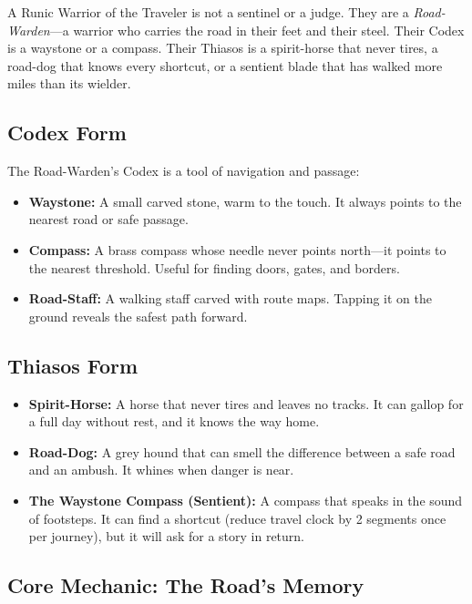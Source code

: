 A Runic Warrior of the Traveler is not a sentinel or a judge. They are a \textit{Road-Warden}—a warrior who carries the road in their feet and their steel. Their Codex is a waystone or a compass. Their Thiasos is a spirit-horse that never tires, a road-dog that knows every shortcut, or a sentient blade that has walked more miles than its wielder.

\subsection{Codex Form}

The Road-Warden's Codex is a tool of navigation and passage:

\begin{itemize}
\item \textbf{Waystone:} A small carved stone, warm to the touch. It always points to the nearest road or safe passage.
\item \textbf{Compass:} A brass compass whose needle never points north—it points to the nearest threshold. Useful for finding doors, gates, and borders.
\item \textbf{Road-Staff:} A walking staff carved with route maps. Tapping it on the ground reveals the safest path forward.
\end{itemize}

\subsection{Thiasos Form}

\begin{itemize}
\item \textbf{Spirit-Horse:} A horse that never tires and leaves no tracks. It can gallop for a full day without rest, and it knows the way home.
\item \textbf{Road-Dog:} A grey hound that can smell the difference between a safe road and an ambush. It whines when danger is near.
\item \textbf{The Waystone Compass (Sentient):} A compass that speaks in the sound of footsteps. It can find a shortcut (reduce travel clock by 2 segments once per journey), but it will ask for a story in return.
\end{itemize}

\subsection{Core Mechanic: The Road's Memory}

